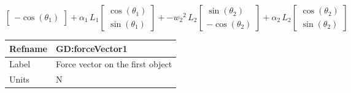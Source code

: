 \documentclass[12pt]{article}
\begin{document}
{\begin{displaymath}
{\begin{bmatrix}
                                                        -\cos\left({θ_{1}}\right)
                                                        \end{bmatrix}+{α_{1}}\,{L_{1}} \begin{bmatrix}
                                                                                       \cos\left({θ_{1}}\right)\\
                                                                                       \sin\left({θ_{1}}\right)
                                                                                       \end{bmatrix}+-{w_{2}}^{2}\,{L_{2}} \begin{bmatrix}
                                                                                                                           \sin\left({θ_{2}}\right)\\
                                                                                                                           -\cos\left({θ_{2}}\right)
                                                                                                                           \end{bmatrix}+{α_{2}}\,{L_{2}} \begin{bmatrix}
                                                                                                                                                          \cos\left({θ_{2}}\right)\\
                                                                                                                                                          \sin\left({θ_{2}}\right)
                                                                                                                                                          \end{bmatrix}}
\end{displaymath}
\medskip
\noindent
\begin{minipage}{\textwidth}
\begin{tabular}{>{\raggedright}p{}>{\raggedright\arraybackslash}p{}}
\toprule \textbf{Refname} & \textbf{GD:forceVector1}
\label{GD:forceVector1}
\\ \midrule
Label & Force vector on the first object
        
\\ \midrule
Units & ${\text{N}}$
        

\end{tabular}
\end{minipage}}
\end{document}
